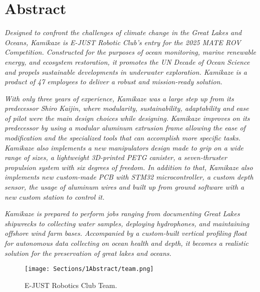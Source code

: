 \section{Abstract}
\normalsize
\textit{\fontsize{10.5pt}{11pt}\selectfont Designed to confront the challenges of climate change in the Great Lakes and Oceans, Kamikaze is E-JUST Robotic Club’s entry for the 2025 MATE ROV Competition. Constructed for the purposes of ocean monitoring, marine renewable energy, and ecosystem restoration, it promotes the UN Decade of Ocean Science and propels sustainable developments in underwater exploration. Kamikaze is a product of 47 employees to deliver a robust and mission-ready solution.}

\textit{\fontsize{10.5pt}{11pt}\selectfont With only three years of experience, Kamikaze was a large step up from its predecessor Shiro Kaijin, where modularity, sustainability, adaptability and ease of pilot were the main design choices while designing. Kamikaze improves on its predecessor by using a modular aluminum extrusion frame allowing the ease of modification and the specialized tools that can accomplish more specific tasks. Kamikaze also implements a new manipulators design made to grip on a wide range of sizes, a lightweight 3D-printed PETG canister, a seven-thruster propulsion system with six degrees of freedom. In addition to that, Kamikaze also implements new custom-made PCB with STM32 microcontroller, a custom depth sensor, the usage of aluminum wires and built up from ground software with a new custom station to control it.}

\textit{\fontsize{10.5pt}{11pt}\selectfont Kamikaze is prepared to perform jobs ranging from documenting Great Lakes shipwrecks to collecting water samples, deploying hydrophones, and maintaining offshore wind farm bases. Accompanied by a custom-built vertical profiling float for autonomous data collecting on ocean health and depth, it becomes a realistic solution for the preservation of great lakes and oceans.}

\normalsize
\begin{figure}[hb!]
    \centering
    \texttt{[image: Sections/1Abstract/team.png]}
    \caption{E-JUST Robotics Club Team.}
    \label{fig:team}
\end{figure}